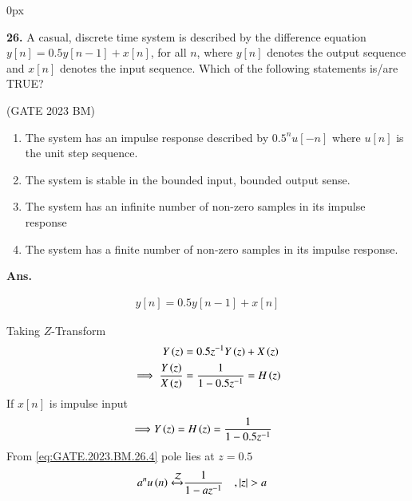\documentclass[journal,12pt,twocolumn]{IEEEtran}
\begin{document}
\parindent 0px


\vspace{3cm}

\title{}
\author{EE23BTECH11042 -  Khusinadha Naik$^{*}$
}
\maketitle
\newpage
\bigskip



\noindent \textbf{26.} \hspace{2pt}A casual, discrete time system is described by the difference equation $y[n] = 0.5 y[n-1] + x[n]$, for all $n$, where $y[n]$ denotes the output sequence and $x[n]$ denotes the input sequence. Which of the following statements is/are TRUE?
\begin{flushright}
\hfill(GATE 2023 BM)
\end{flushright}
\begin{enumerate}[label = (\alph*)]
	\item The system has an impulse response described by $0.5^{n} u[-n]$ where $u[n]$ is the  
unit step sequence. 		
	\item The system is stable in the bounded input, bounded output sense.		
	\item The system has an infinite number of non-zero samples in its impulse response	
	\item The system has a finite number of non-zero samples in its impulse response.
\end{enumerate}

\noindent \textbf{Ans.}\\
\fi
\begin{table}[h]

\end{table}
\begin{align}
y[n] = 0.5y[n-1] + x[n] 
\end{align}

Taking $Z$-Transform 
\begin{align}
Y\left(z\right) &= 0.5z^{-1}Y\left(z\right) + X\left(z\right) \\
\implies \frac{Y\left(z\right)}{X\left(z\right)} &= \frac{1}{1 - 0.5z^{-1}} = H\left(z\right) 
\end{align}
If $x[n]$ is impulse input 
\begin{align}
\implies &Y\left(z\right) = H\left(z\right) = \frac{1}{1 - 0.5z^{-1}}  \label{eq:GATE.2023.BM.26.4}
\end{align}
From \eqref{eq:GATE.2023.BM.26.4} pole lies at $z = 0.5$
\begin{align}
a^{n}u\left(n\right) \xleftrightarrow{\mathcal{Z}} &\frac{1}{1 - az^{-1}} \quad , \left\vert z\right\vert > a \label{eq:GATE.2023.BM.26.5}
\end{align}
\end{document}
